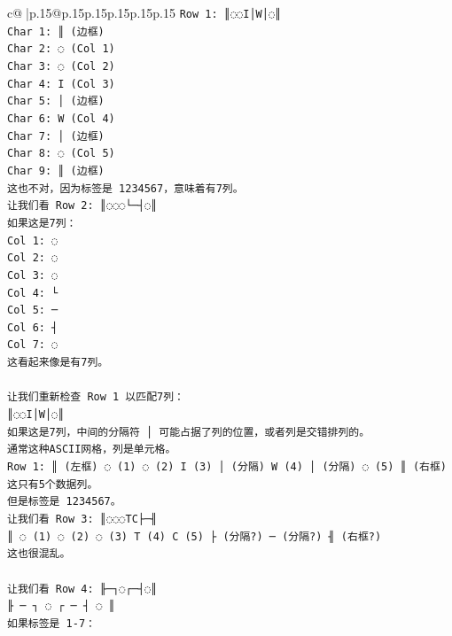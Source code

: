 \documentclass{article}
\begin{document}
{\begin{supertabular}{c@{$\;$}|p{.15\linewidth}@{}p{.15\linewidth}p{.15\linewidth}p{.15\linewidth}p{.15\linewidth}p{.15\linewidth}}
{{{\texttt{Row 1: ║◌◌I│W│◌║} \\
\texttt{Char 1: ║ (边框)} \\
\texttt{Char 2: ◌ (Col 1)} \\
\texttt{Char 3: ◌ (Col 2)} \\
\texttt{Char 4: I (Col 3)} \\
\texttt{Char 5: │ (边框)} \\
\texttt{Char 6: W (Col 4)} \\
\texttt{Char 7: │ (边框)} \\
\texttt{Char 8: ◌ (Col 5)} \\
\texttt{Char 9: ║ (边框)} \\
\texttt{这也不对，因为标签是 1234567，意味着有7列。} \\
\texttt{让我们看 Row 2: ║◌◌◌└─┤◌║} \\
\texttt{如果这是7列：} \\
\texttt{Col 1: ◌} \\
\texttt{Col 2: ◌} \\
\texttt{Col 3: ◌} \\
\texttt{Col 4: └} \\
\texttt{Col 5: ─} \\
\texttt{Col 6: ┤} \\
\texttt{Col 7: ◌} \\
\texttt{这看起来像是有7列。} \\
\\ 
\texttt{让我们重新检查 Row 1 以匹配7列：} \\
\texttt{║◌◌I│W│◌║} \\
\texttt{如果这是7列，中间的分隔符 │ 可能占据了列的位置，或者列是交错排列的。} \\
\texttt{通常这种ASCII网格，列是单元格。} \\
\texttt{Row 1: ║ (左框) ◌ (1) ◌ (2) I (3) │ (分隔) W (4) │ (分隔) ◌ (5) ║ (右框)} \\
\texttt{这只有5个数据列。} \\
\texttt{但是标签是 1234567。} \\
\texttt{让我们看 Row 3: ║◌◌◌TC├─╢} \\
\texttt{║ ◌ (1) ◌ (2) ◌ (3) T (4) C (5) ├ (分隔?) ─ (分隔?) ╢ (右框?)} \\
\texttt{这也很混乱。} \\
\\ 
\texttt{让我们看 Row 4: ╟─┐◌┌─┤◌║} \\
\texttt{╟ ─ ┐ ◌ ┌ ─ ┤ ◌ ║} \\
\texttt{如果标签是 1{-}7：} \\
}}}
\end{supertabular}}
\end{document}
